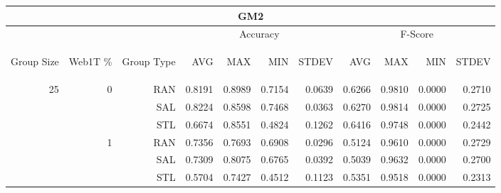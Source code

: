 \begin{center}
\begin{table}[htbp]
\begin{tabular}{ | r | r | r | r | r | r | r | r | r | r | r |}
\hline
\multicolumn{11}{|c|}{GM2}\\
\hline
 & & & \multicolumn{4}{|c|}{Accuracy} & \multicolumn{4}{|c|}{F-Score}\\ \cline{4-11}
\begin{sideways}Group Size\end{sideways} & \begin{sideways}Web1T \%\end{sideways} & \begin{sideways}Group Type\end{sideways} & \begin{sideways}AVG\end{sideways} & \begin{sideways}MAX\end{sideways} & \begin{sideways}MIN\end{sideways} & \begin{sideways}STDEV\end{sideways} & \begin{sideways}AVG\end{sideways} & \begin{sideways}MAX\end{sideways} & \begin{sideways}MIN\end{sideways} & \begin{sideways}STDEV\end{sideways}\\
\hline
\multirow{18}{*}{25}
 & \multirow{3}{*}{0} & RAN & 0.8191 & 0.8989 & 0.7154 & 0.0639 & 0.6266 & 0.9810 & 0.0000 & 0.2710\\ \cline{3-11}
 &   & SAL & 0.8224 & 0.8598 & 0.7468 & 0.0363 & 0.6270 & 0.9814 & 0.0000 & 0.2725\\ \cline{3-11}
 &   & STL & 0.6674 & 0.8551 & 0.4824 & 0.1262 & 0.6416 & 0.9748 & 0.0000 & 0.2442\\ \cline{2-11}
 & \multirow{3}{*}{1} & RAN & 0.7356 & 0.7693 & 0.6908 & 0.0296 & 0.5124 & 0.9610 & 0.0000 & 0.2729\\ \cline{3-11}
 &   & SAL & 0.7309 & 0.8075 & 0.6765 & 0.0392 & 0.5039 & 0.9632 & 0.0000 & 0.2700\\ \cline{3-11}
 &   & STL & 0.5704 & 0.7427 & 0.4512 & 0.1123 & 0.5351 & 0.9518 & 0.0000 & 0.2313\\ \cline{2-11}

\end{tabular}
\end{table}
\end{center}
